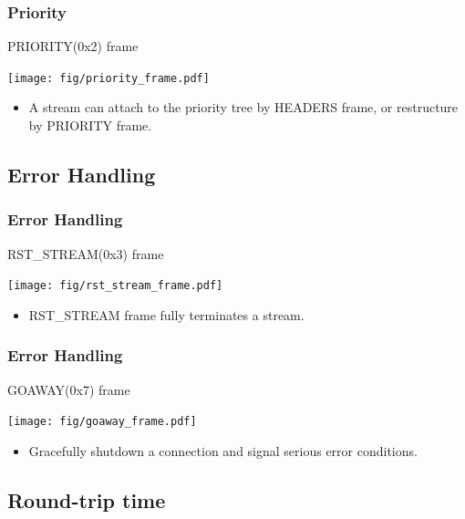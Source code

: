 \documentclass[lualatex]{beamer}
\begin{document}
\begin{frame}
  \frametitle{Priority}
  \begin{block}{PRIORITY(0x2) frame}
    \begin{center}
      \texttt{[image: fig/priority\_frame.pdf]}
    \end{center}
    \begin{itemize}
    \item A stream can attach to the priority tree by HEADERS frame, or restructure by PRIORITY frame.
    \end{itemize}
  \end{block}
\end{frame}

\subsection{Error Handling}

\begin{frame}
  \frametitle{Error Handling}
  \begin{block}{RST\_STREAM(0x3) frame}
    \begin{center}
      \texttt{[image: fig/rst\_stream\_frame.pdf]}
    \end{center}
    \begin{itemize}
    \item RST\_STREAM frame fully terminates a stream.
    \end{itemize}
  \end{block}
\end{frame}

\begin{frame}
  \frametitle{Error Handling}
  \begin{block}{GOAWAY(0x7) frame}
    \begin{center}
      \texttt{[image: fig/goaway\_frame.pdf]}
    \end{center}
    \begin{itemize}
    \item Gracefully shutdown a connection and signal serious error conditions.
    \end{itemize}
  \end{block}
\end{frame}

\subsection{Round-trip time}
\end{document}
